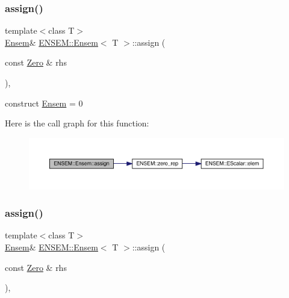 \subsubsection{\texorpdfstring{assign()}{assign()}\hspace{0.1cm}{\footnotesize\ttfamily [7/8]}}
{\footnotesize\ttfamily template$<$class T$>$ \\
\mbox{\hyperlink{classENSEM_1_1Ensem}{Ensem}}\& \mbox{\hyperlink{classENSEM_1_1Ensem}{E\+N\+S\+E\+M\+::\+Ensem}}$<$ T $>$\+::assign (\begin{DoxyParamCaption}\item[{const \mbox{\hyperlink{structENSEM_1_1Zero}{Zero}} \&}]{rhs }\end{DoxyParamCaption})\hspace{0.3cm}{\ttfamily [inline]}, {\ttfamily [protected]}}



construct \mbox{\hyperlink{classENSEM_1_1Ensem}{Ensem}} = 0 

Here is the call graph for this function\+:
\nopagebreak
\begin{figure}[H]
\begin{center}
\leavevmode
\includegraphics[width=350pt]{d7/d3e/classENSEM_1_1Ensem_a140d8bb94d07a0abfb2ad396df63c625_cgraph}
\end{center}
\end{figure}
\mbox{\label{classENSEM_1_1Ensem_a140d8bb94d07a0abfb2ad396df63c625}} 
\subsubsection{\texorpdfstring{assign()}{assign()}\hspace{0.1cm}{\footnotesize\ttfamily [8/8]}}
{\footnotesize\ttfamily template$<$class T$>$ \\
\mbox{\hyperlink{classENSEM_1_1Ensem}{Ensem}}\& \mbox{\hyperlink{classENSEM_1_1Ensem}{E\+N\+S\+E\+M\+::\+Ensem}}$<$ T $>$\+::assign (\begin{DoxyParamCaption}\item[{const \mbox{\hyperlink{structENSEM_1_1Zero}{Zero}} \&}]{rhs }\end{DoxyParamCaption})\hspace{0.3cm}{\ttfamily [inline]}, {\ttfamily [protected]}}



